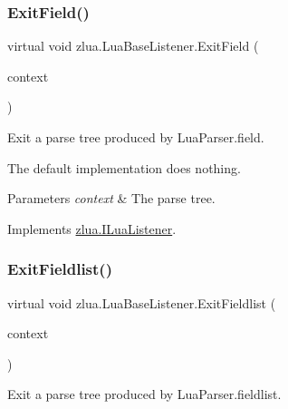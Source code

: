 \subsubsection{\texorpdfstring{Exit\+Field()}{ExitField()}}
{\footnotesize\ttfamily virtual void zlua.\+Lua\+Base\+Listener.\+Exit\+Field (\begin{DoxyParamCaption}\item[{\mbox{[}\+Not\+Null\mbox{]} \mbox{\hyperlink{classzlua_1_1_lua_parser_1_1_field_context}{Lua\+Parser.\+Field\+Context}}}]{context }\end{DoxyParamCaption})\hspace{0.3cm}{\ttfamily [virtual]}}



Exit a parse tree produced by Lua\+Parser.\+field. 

The default implementation does nothing.


\begin{DoxyParams}{Parameters}
{\em context} & The parse tree.\\
\hline
\end{DoxyParams}


Implements \mbox{\hyperlink{interfacezlua_1_1_i_lua_listener_aa5a80474f82e45908ec603e36a505f84}{zlua.\+I\+Lua\+Listener}}.

\mbox{\label{classzlua_1_1_lua_base_listener_a44a0860d791e1bf2b19f911adf58ff72}} 
\subsubsection{\texorpdfstring{Exit\+Fieldlist()}{ExitFieldlist()}}
{\footnotesize\ttfamily virtual void zlua.\+Lua\+Base\+Listener.\+Exit\+Fieldlist (\begin{DoxyParamCaption}\item[{\mbox{[}\+Not\+Null\mbox{]} \mbox{\hyperlink{classzlua_1_1_lua_parser_1_1_fieldlist_context}{Lua\+Parser.\+Fieldlist\+Context}}}]{context }\end{DoxyParamCaption})\hspace{0.3cm}{\ttfamily [virtual]}}



Exit a parse tree produced by Lua\+Parser.\+fieldlist. 

